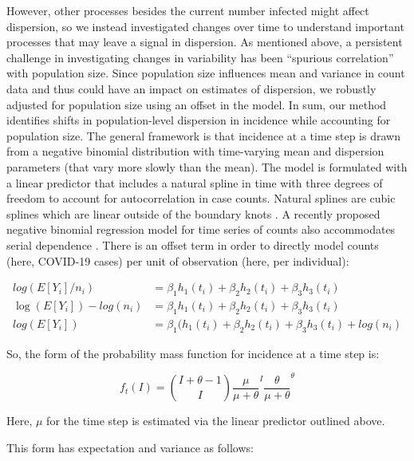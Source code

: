 \documentclass[10pt,letterpaper]{article}
\begin{document}
\noindent However, other processes besides the current number infected might affect dispersion, so we instead investigated changes over time to understand important processes that may leave a signal in dispersion. 
As mentioned above, a persistent challenge in investigating changes in variability has been ``spurious correlation'' with population size. 
Since population size influences mean and variance in count data and thus could have an impact on estimates of dispersion, we robustly adjusted for population size using an offset in the model. 
In sum, our method identifies shifts in population-level dispersion in incidence while accounting for population size. 
The general framework is that incidence at a time step is drawn from a negative binomial distribution with time-varying mean and dispersion parameters (that vary more slowly than the mean). 
The model is formulated with a linear predictor that includes a natural spline in time with three degrees of freedom to account for autocorrelation in case counts. 
Natural splines are cubic splines which are linear outside of the boundary knots \cite{perperoglou_review_2019}. 
A recently proposed negative binomial regression model for time series of counts also accommodates serial dependence \cite{davis_negative_2009}. 
There is an offset term in order to directly model counts (here, COVID-19 cases) per unit of observation (here, per individual):

\begin{align}
  log(E[Y_i]/n_i) &= \beta_1h_1(t_i) + \beta_2h_2(t_i) + \beta_3h_3(t_i) \\
  \log(E[Y_i])-log(n_i) &= \beta_1h_1(t_i) + \beta_2h_2(t_i) + \beta_3h_3(t_i) \\ 
  log(E[Y_i]) &= \beta_1(h_1(t_i) + \beta_2h_2(t_i) + \beta_3h_3(t_i) + log(n_i) 
\end{align}

So, the form of the probability mass function for incidence at a time step is:

\begin{equation}
  f_t(I) = \binom{I + \theta - 1}{I} \frac{\mu}{\mu+\theta}^I \frac{\theta}{\mu +\theta}^\theta
\end{equation}

Here, \begin{math}\mu\end{math} for the time step is estimated via the linear predictor outlined above.

This form has expectation and variance as follows:
\end{document}
